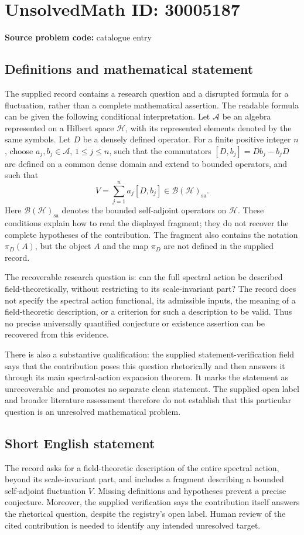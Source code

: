 \documentclass[11pt]{article}
\begin{document}
\section*{UnsolvedMath ID: 30005187}
\textbf{Source problem code:} catalogue entry
\subsection{Definitions and mathematical statement}
The supplied record contains a research question and a disrupted formula for a fluctuation, rather than a complete mathematical assertion. The readable formula can be given the following conditional interpretation. Let \(\mathcal A\) be an algebra represented on a Hilbert space \(\mathcal H\), with its represented elements denoted by the same symbols. Let \(D\) be a densely defined operator. For a finite positive integer \(n\), choose \(a_j,b_j\in\mathcal A\), \(1\leq j\leq n\), such that the commutators \([D,b_j]=Db_j-b_jD\) are defined on a common dense domain and extend to bounded operators, and such that
\[
V=\sum_{j=1}^{n}a_j[D,b_j]\in\mathcal B(\mathcal H)_{\mathrm{sa}}.
\]
Here \(\mathcal B(\mathcal H)_{\mathrm{sa}}\) denotes the bounded self-adjoint operators on \(\mathcal H\). These conditions explain how to read the displayed fragment; they do not recover the complete hypotheses of the contribution. The fragment also contains the notation \(\pi_D(A)\), but the object \(A\) and the map \(\pi_D\) are not defined in the supplied record.

The recoverable research question is: can the full spectral action be described field-theoretically, without restricting to its scale-invariant part? The record does not specify the spectral action functional, its admissible inputs, the meaning of a field-theoretic description, or a criterion for such a description to be valid. Thus no precise universally quantified conjecture or existence assertion can be recovered from this evidence.

There is also a substantive qualification: the supplied statement-verification field says that the contribution poses this question rhetorically and then answers it through its main spectral-action expansion theorem. It marks the statement as unrecoverable and promotes no separate clean statement. The supplied open label and broader literature assessment therefore do not establish that this particular question is an unresolved mathematical problem.
\subsection{Short English statement}
The record asks for a field-theoretic description of the entire spectral action, beyond its scale-invariant part, and includes a fragment describing a bounded self-adjoint fluctuation \(V\). Missing definitions and hypotheses prevent a precise conjecture. Moreover, the supplied verification says the contribution itself answers the rhetorical question, despite the registry's open label. Human review of the cited contribution is needed to identify any intended unresolved target.
\end{document}

